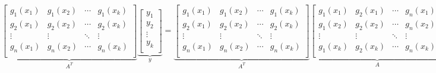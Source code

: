 \documentclass{article}
\begin{document}
                    \[
                        \underbrace{
                        \begin{bmatrix}
                            g_{1}(x_{1}) & g_{1}(x_{2}) & \cdots & g_{1}(x_{k})\\
                            g_{2}(x_{1}) & g_{2}(x_{2}) & \cdots & g_{2}(x_{k})\\
                            \vdots       & \vdots       & \ddots & \vdots\\
                            g_{n}(x_{1}) & g_{n}(x_{2}) & \cdots & g_{n}(x_{k})\\
                        \end{bmatrix}}_{A^{T}}
                        \underbrace{
                        \begin{bmatrix}
                            y_{1}\\ y_{2}\\ \vdots\\ y_{k}\\
                        \end{bmatrix}}_{y} =
                        \underbrace{
                        \begin{bmatrix}
                            g_{1}(x_{1}) & g_{1}(x_{2}) & \cdots & g_{1}(x_{k})\\
                            g_{2}(x_{1}) & g_{2}(x_{2}) & \cdots & g_{2}(x_{k})\\
                            \vdots       & \vdots       & \ddots & \vdots\\
                            g_{n}(x_{1}) & g_{n}(x_{2}) & \cdots & g_{n}(x_{k})\\
                        \end{bmatrix}}_{A^{T}}
                        \underbrace{
                        \begin{bmatrix}
                            g_{1}(x_{1}) & g_{2}(x_{1}) & \cdots & g_{n}(x_{1})\\
                            g_{1}(x_{2}) & g_{2}(x_{2}) & \cdots & g_{n}(x_{2})\\
                            \vdots       & \vdots       & \ddots & \vdots\\
                            g_{1}(x_{k}) & g_{2}(x_{k}) & \cdots & g_{n}(x_{k})\\
                        \end{bmatrix}}_{A}
                        \underbrace{
                        \begin{bmatrix}
                            \alpha_{1}\\ \alpha_{2}\\ \vdots\\ \alpha_{n}\\
                        \end{bmatrix}}_{\alpha}
                    \]
\end{document}
